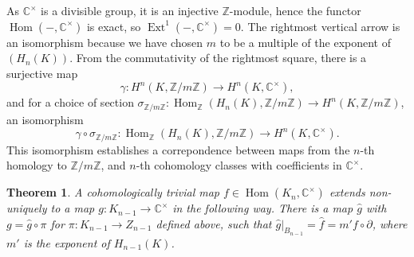 \documentclass[11pt]{book}
\newtheorem{theorem}{Theorem}[section]
\theoremstyle{Rem}
\theoremstyle{definition}
\numberwithin{equation}{section}
\newcommand\Hom{\operatorname{Hom}}
\newcommand\Ext{\operatorname{Ext}}
\newcommand\CC{\mathbb C}
\newcommand\ZZ{\mathbb Z}
\begin{document}
 As $\CC^\times$ is a divisible group, it is an injective $\ZZ$-module, hence the functor $\Hom(-, \CC^\times)$ is exact, so $\Ext^1(-,\CC^\times) =0$. The rightmost vertical arrow is an isomorphism because we have chosen $m$ to be a multiple of the  exponent of $(H_n(K))$. From the commutativity of the rightmost square, there is a surjective map \begin{equation}
 	\gamma: H^n(K, \ZZ /m\ZZ)\rightarrow H^n(K, \CC^\times),
 \end{equation} and for a choice of section $\sigma_{\ZZ/m\ZZ}: \Hom_{\ZZ}(H_n(K), \ZZ/m\ZZ)\rightarrow H^n(K,\ZZ/m\ZZ)$, an isomorphism \begin{equation}
 	\gamma\circ\sigma_{\ZZ/m\ZZ}:\Hom_{\ZZ}(H_n(K), \ZZ/m\ZZ)\rightarrow H^n(K, \CC^\times). \label{cohococycle}
 \end{equation} This isomorphism establishes a correpondence between maps from the $n$-th homology to $\ZZ/m\ZZ$, and $n$-th cohomology classes with coefficients in $\CC^\times$.
\begin{theorem}\label{cochain}
A cohomologically trivial map $f\in \Hom(K_n,\CC^\times)$  extends non-uniquely to a map $g:K_{n-1} \rightarrow \CC^\times$ in the following way. There is a map $\hat{g}$ with $g = \hat{g}\circ \pi$ for $\pi: K_{n-1}\rightarrow Z_{n-1}$ defined above,  such that $\hat{g}|_{B_{n-1}} = \hat{f} = m'f\circ\partial$, where $m'$ is the exponent of $H_{n-1}(K)$.
\end{theorem}
\end{document}

